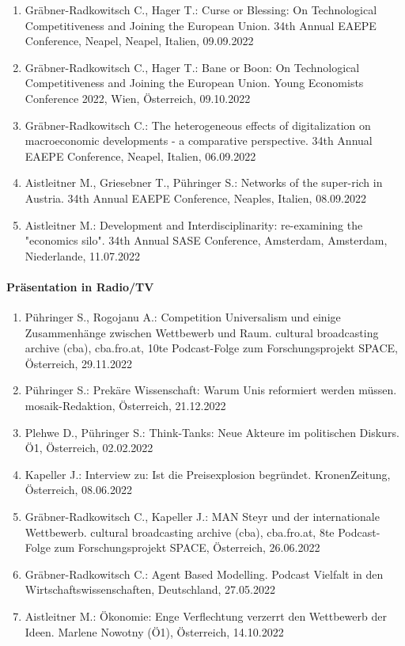 \begin{enumerate}
	\item Gräbner-Radkowitsch C., Hager T.: Curse or Blessing: On Technological Competitiveness and Joining the European Union. 34th Annual EAEPE Conference, Neapel, Neapel, Italien, 09.09.2022
	\item Gräbner-Radkowitsch C., Hager T.: Bane or Boon: On Technological Competitiveness and Joining the European Union. Young Economists Conference 2022, Wien, Österreich, 09.10.2022
	\item Gräbner-Radkowitsch C.: The heterogeneous effects of digitalization on macroeconomic developments - a comparative perspective. 34th Annual EAEPE Conference, Neapel, Italien, 06.09.2022
	\item Aistleitner M., Griesebner T., Pühringer S.: Networks of the super-rich in Austria. 34th Annual EAEPE Conference, Neaples, Italien, 08.09.2022
	\item Aistleitner M.: Development and Interdisciplinarity: re-examining the "economics silo". 34th Annual SASE Conference, Amsterdam, Amsterdam, Niederlande, 11.07.2022
\end{enumerate}
\paragraph{Präsentation in Radio/TV}
\begin{enumerate}
	\item Pühringer S., Rogojanu A.: Competition Universalism und einige Zusammenhänge zwischen Wettbewerb und Raum. cultural broadcasting archive (cba), cba.fro.at, 10te Podcast-Folge zum Forschungsprojekt SPACE, Österreich, 29.11.2022
	\item Pühringer S.: Prekäre Wissenschaft: Warum Unis reformiert werden müssen. mosaik-Redaktion, Österreich, 21.12.2022
	\item Plehwe D., Pühringer S.: Think-Tanks: Neue Akteure im politischen Diskurs. Ö1, Österreich, 02.02.2022
	\item Kapeller J.: Interview zu: Ist die Preisexplosion begründet. KronenZeitung, Österreich, 08.06.2022
	\item Gräbner-Radkowitsch C., Kapeller J.: MAN Steyr und der internationale Wettbewerb. cultural broadcasting archive (cba), cba.fro.at, 8te Podcast-Folge zum Forschungsprojekt SPACE, Österreich, 26.06.2022
	\item Gräbner-Radkowitsch C.: Agent Based Modelling. Podcast Vielfalt in den Wirtschaftswissenschaften, Deutschland, 27.05.2022
	\item Aistleitner M.: Ökonomie: Enge Verflechtung verzerrt den Wettbewerb der Ideen. Marlene Nowotny (Ö1), Österreich, 14.10.2022
\end{enumerate}
